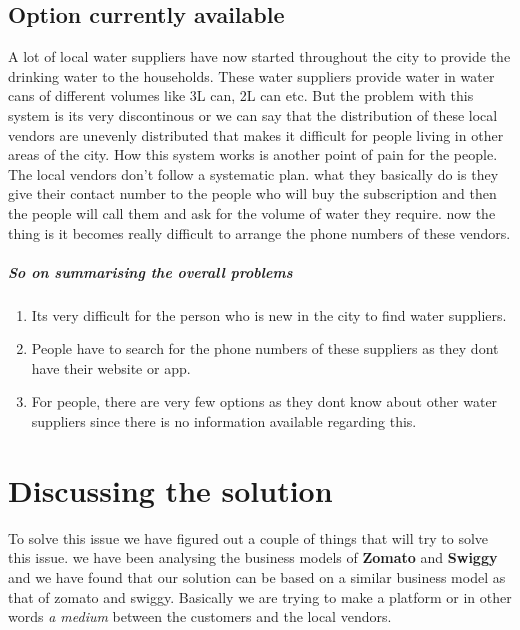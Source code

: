 \documentclass[a4paper, 12pt]{report}
\begin{document}
\subsection[short]{Option currently available}
A lot of local water suppliers have now started throughout the city to provide the drinking water to the households. These water suppliers provide water in water cans 
of different volumes like 3L can, 2L can etc. But the problem with this system is its very discontinous or we can say that the distribution of these local vendors are
unevenly distributed that makes it difficult for people living in other areas of the city. How this system works is another point of pain for the people. The local vendors
don't follow a systematic plan. what they basically do is they give their contact number to the people who will buy the subscription and then the people will call them and
ask for the volume of water they require. now the thing is it becomes really difficult to arrange the phone numbers of these vendors. 
\subparagraph*{So on summarising the overall problems}

\begin{enumerate}
    \item Its very difficult for the person who is new in the city to find water suppliers.
    \item People have to search for the phone numbers of these suppliers as they dont have their website or app.
    \item For people, there are very few options as they dont know about other water suppliers since there is no information available regarding this.
\end{enumerate}

\section*{Discussing the solution}
To solve this issue we have figured out a couple of things that will try to solve this issue. we have been analysing the business
models of \textbf{Zomato} and \textbf{Swiggy} and we have found that our solution can be based on a similar business model as that 
of zomato and swiggy. Basically we are trying to make a platform or in other words \textit{a medium} between the customers and the 
local vendors.
\end{document}
